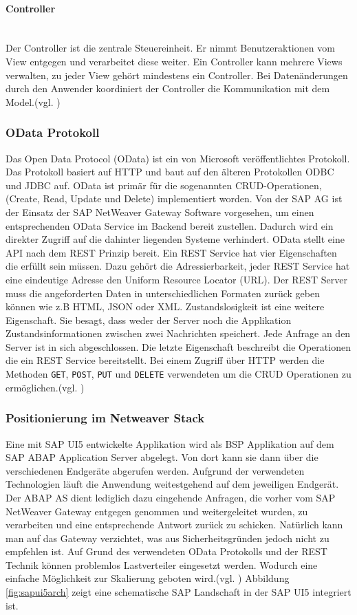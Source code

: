 \paragraph{Controller}$\;$ \\
Der Controller ist die zentrale Steuereinheit. Er nimmt Benutzeraktionen vom View entgegen und verarbeitet diese weiter. Ein Controller kann mehrere Views verwalten, zu jeder View gehört mindestens ein Controller. Bei Datenänderungen durch den Anwender koordiniert der Controller die Kommunikation mit dem Model.(vgl. \cite[S.123f]{AntoEinf2014})

\subsubsection{OData Protokoll}
\glqq Das Open Data Protocol (OData) ist ein von Microsoft veröffentlichtes Protokoll. Das Protokoll basiert auf HTTP und baut auf den älteren Protokollen ODBC und JDBC auf. OData ist primär für die sogenannten CRUD-Operationen, (Create, Read, Update und Delete) implementiert worden.\grqq{}\cite[S.168]{AntoEinf2014} Von der SAP AG ist der Einsatz der SAP NetWeaver Gateway Software vorgesehen, um einen entsprechenden OData Service im Backend bereit zustellen. Dadurch wird ein direkter Zugriff auf die dahinter liegenden Systeme verhindert. OData stellt eine API nach dem REST Prinzip bereit. Ein REST Service hat vier Eigenschaften die erfüllt sein müssen. Dazu gehört die Adressierbarkeit, jeder REST Service hat eine eindeutige Adresse den Uniform Resource Locator (URL). Der REST Server muss die angeforderten Daten in unterschiedlichen Formaten zurück geben können wie z.B HTML, JSON oder XML. Zustandslosigkeit ist eine weitere Eigenschaft. Sie besagt, dass weder der Server noch die Applikation Zustandsinformationen zwischen zwei Nachrichten speichert. Jede Anfrage an den Server ist in sich abgeschlossen. Die letzte Eigenschaft beschreibt die Operationen die ein REST Service bereitstellt. Bei einem Zugriff über HTTP werden die Methoden \texttt{GET}, \texttt{POST}, \texttt{PUT} und \texttt{DELETE} verwendeten um die CRUD Operationen zu ermöglichen.(vgl. \cite{wikirest})

\subsubsection{Positionierung im Netweaver Stack}
Eine mit SAP UI5 entwickelte Applikation wird als BSP Applikation auf dem SAP ABAP Application Server abgelegt. Von dort kann sie dann über die verschiedenen Endgeräte abgerufen werden. Aufgrund der verwendeten Technologien läuft die Anwendung weitestgehend auf dem jeweiligen Endgerät. Der ABAP AS dient lediglich dazu eingehende Anfragen, die vorher vom SAP NetWeaver Gateway entgegen genommen und weitergeleitet wurden, zu verarbeiten und eine entsprechende Antwort zurück zu schicken. Natürlich kann man auf das Gateway verzichtet, was aus Sicherheitsgründen jedoch nicht zu empfehlen ist. Auf Grund des verwendeten OData Protokolls und der REST Technik können problemlos Lastverteiler eingesetzt werden. Wodurch eine einfache Möglichkeit zur Skalierung geboten wird.(vgl. \cite{SAPFIORIARCH}) Abbildung \ref{fig:sapui5arch} zeigt eine schematische SAP Landschaft in der SAP UI5 integriert ist.

